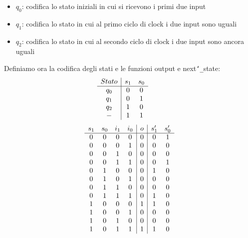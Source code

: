\documentclass{article}
\begin{document}
\begin{enumerate}
        \begin{itemize}
            \item $q_0$: codifica lo stato iniziali in cui si ricevono i primi due input
            \item $q_1$: codifica lo stato in cui al primo ciclo di clock i due input sono uguali
            \item $q_2$: codifica lo stato in cui al secondo ciclo di clock i due input sono ancora uguali
        \end{itemize}
        Definiamo ora la codifica degli stati e le funzioni output e next\texttt{\char`_}state:
        \begin{equation*}
        \begin{array}{c c c c c}
            \begin{array}{c|c c}
            Stato & s_1 & s_0\\
            \hline
            q_0 & 0 & 0 \\
            q_1 & 0 & 1 \\
            q_2 & 1 & 0 \\
            -   & 1 & 1 
            \end{array}
            &      &
        \end{array}
        \end{equation*}
        \begin{equation*}
        \begin{array}{c c c c c}
            \begin{array}{c c c c|c | c c}
            s_1 & s_0 & i_1 & i_0 & o & s'_1 & s'_0\\
            \hline
            0 & 0 & 0 & 0 & 0 & 0 & 1\\
            0 & 0 & 0 & 1 & 0 & 0 & 0\\
            0 & 0 & 1 & 0 & 0 & 0 & 0\\
            0 & 0 & 1 & 1 & 0 & 0 & 1\\
            0 & 1 & 0 & 0 & 0 & 1 & 0\\
            0 & 1 & 0 & 1 & 0 & 0 & 0\\
            0 & 1 & 1 & 0 & 0 & 0 & 0\\
            0 & 1 & 1 & 1 & 0 & 1 & 0\\
            1 & 0 & 0 & 0 & 1 & 1 & 0\\
            1 & 0 & 0 & 1 & 0 & 0 & 0\\
            1 & 0 & 1 & 0 & 0 & 0 & 0\\
            1 & 0 & 1 & 1 & 1 & 1 & 0\\

\end{array}
\end{array}
\end{equation*}
\end{enumerate}
\end{document}
